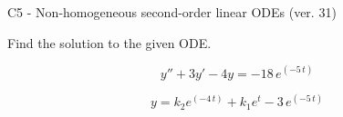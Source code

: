 \begin{exercise}
  \begin{exerciseTitle}C5 - Non-homogeneous second-order linear ODEs (ver. 31)\end{exerciseTitle}
  \begin{exerciseStatement}
    
Find the solution to the given ODE.

    
\[y''+3y'-4y = -18 \, e^{\left(-5 \, t\right)}\]

  \end{exerciseStatement}
  \begin{exerciseAnswer}
    
\[y= k_{2} e^{\left(-4 \, t\right)} + k_{1} e^{t} - 3 \, e^{\left(-5 \, t\right)}\]

  \end{exerciseAnswer}
\end{exercise}